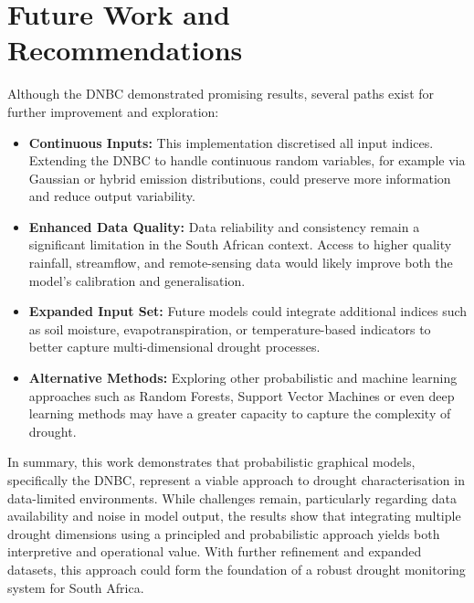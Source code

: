 \section*{Future Work and Recommendations}

Although the DNBC demonstrated promising results, several paths exist for further improvement and exploration:

\begin{itemize}
    \item \textbf{Continuous Inputs:} This implementation discretised all input indices. Extending the DNBC to handle continuous random variables, for example via Gaussian or hybrid emission distributions, could preserve more information and reduce output variability.
    \item \textbf{Enhanced Data Quality:} Data reliability and consistency remain a significant limitation in the South African context. Access to higher quality rainfall, streamflow, and remote-sensing data would likely improve both the model’s calibration and generalisation.
    \item \textbf{Expanded Input Set:} Future models could integrate additional indices such as soil moisture, evapotranspiration, or temperature-based indicators to better capture multi-dimensional drought processes.
    \item \textbf{Alternative Methods:} Exploring other probabilistic and machine learning approaches such as Random Forests, Support Vector Machines or even deep learning methods may have a greater capacity to capture the complexity of drought. 
\end{itemize}

\noindent In summary, this work demonstrates that probabilistic graphical models, specifically the DNBC, represent a viable approach to drought characterisation in data-limited environments. While challenges remain, particularly regarding data availability and noise in model output, the results show that integrating multiple drought dimensions using a principled and probabilistic approach yields both interpretive and operational value. With further refinement and expanded datasets, this approach could form the foundation of a robust drought monitoring system for South Africa.



